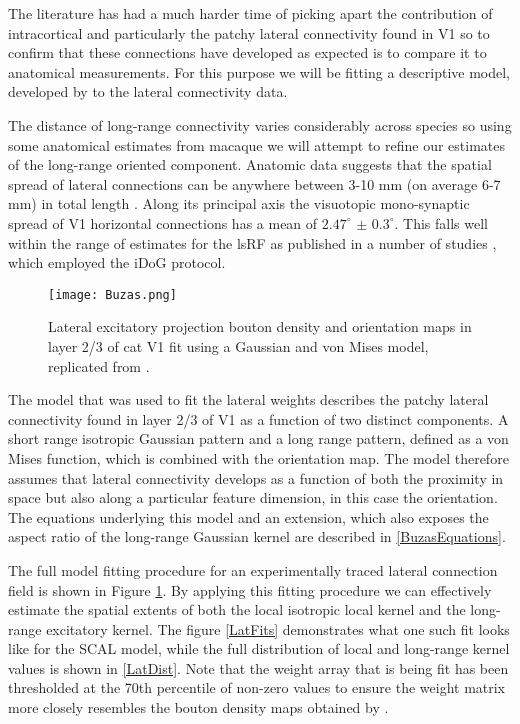 The literature has had a much harder time of picking apart the
contribution of intracortical and particularly the patchy lateral
connectivity found in V1 so to confirm that these connections have
developed as expected is to compare it to anatomical measurements.
For this purpose we will be fitting a descriptive model, developed by
\cite{Buzas2006} to the lateral connectivity data.

The distance of long-range connectivity varies considerably across
species so using some anatomical estimates from macaque we will
attempt to refine our estimates of the long-range oriented
component. Anatomic data suggests that the spatial spread of lateral
connections can be anywhere between 3-10 mm (on average 6-7 mm) in
total length \citep{Angelucci2002}. Along its principal axis the
visuotopic mono-synaptic spread of V1 horizontal connections has a
mean of \(2.47^\circ\) \(\pm\) \(0.3^\circ\). This falls well within
the range of estimates for the lsRF as published in a number of
studies \citep{Sceniak1999, Sceniak2001, Shushruth2009}, which employed
the iDoG protocol.

\begin{figure}
	\centering
        \texttt{[image: Buzas.png]}
	\caption{Lateral excitatory projection bouton density and
          orientation maps in layer 2/3 of cat V1 fit using a Gaussian
          and von Mises model, replicated from \cite{Buzas2006}.}
	\label{Buzas}
\end{figure}

The model that was used to fit the lateral weights describes the
patchy lateral connectivity found in layer 2/3 of V1 as a function of
two distinct components. A short range isotropic Gaussian pattern and
a long range pattern, defined as a von Mises function, which is
combined with the orientation map. The model therefore assumes that
lateral connectivity develops as a function of both the proximity in
space but also along a particular feature dimension, in this case the
orientation. The equations underlying this model and an extension,
which also exposes the aspect ratio of the long-range Gaussian kernel
are described in \ref{BuzasEquations}.

The full model fitting procedure for an experimentally traced lateral
connection field is shown in Figure \ref{Buzas}. By applying this
fitting procedure we can effectively estimate the spatial extents of
both the local isotropic local kernel and the long-range excitatory
kernel. The figure \ref{LatFits} demonstrates what one such fit looks
like for the SCAL model, while the full distribution of local and
long-range kernel values is shown in \ref{LatDist}. Note that the
weight array that is being fit has been thresholded at the 70th
percentile of non-zero values to ensure the weight matrix more closely
resembles the bouton density maps obtained by \cite{Buzas2006}.

